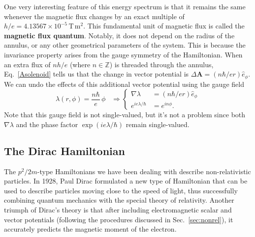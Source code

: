 \documentclass[pra,12pt]{revtex4}
\begin{document}
One very interesting feature of this energy spectrum is that it
remains the same whenever the magnetic flux changes by an exact
multiple of $h/e = 4.13567\times10^{-5}\,\mathrm{T}\,\mathrm{m}^2$.
This fundamental unit of magnetic flux is called the \textbf{magnetic
  flux quantum}.  Notably, it does not depend on the radius of the
annulus, or any other geometrical parameters of the system.  This is
because the invariance property arises from the gauge symmetry of the
Hamiltonian.  When an extra flux of $nh/e$ (where $n\in\mathbb{Z}$) is
threaded through the annulus, Eq.~\eqref{Asolenoid} tells us that the
change in vector potential is $\Delta \mathbf{A} = (n\hbar/ e r)
\hat{e}_\phi$.  We can undo the effects of this additional vector
potential using the gauge field
\begin{equation}
  \lambda(r,\phi) = \frac{n\hbar}{e} \, \phi \;\;\;\Rightarrow
  \begin{cases}\nabla \lambda &= \displaystyle (n\hbar/er) \hat{e}_\phi
    \\ \displaystyle e^{ie\lambda/\hbar} &= \displaystyle e^{in\phi}.
  \end{cases}
\end{equation}
Note that this gauge field is not single-valued, but it's not a
problem since both $\nabla\lambda$ and the phase factor
$\exp(ie\lambda/\hbar)$ remain single-valued.

\subsection{The Dirac Hamiltonian}
\label{sec:DiracH}

The $p^2/2m$-type Hamiltonians we have been dealing with describe
non-relativistic particles.  In 1928, Paul Dirac formulated a new type
of Hamiltonian that can be used to describe particles moving close to
the speed of light, thus successfully combining quantum mechanics with
the special theory of relativity. Another triumph of Dirac's theory is
that after including electromagnetic scalar and vector potentials
(following the procedures discussed in Sec.~\ref{sec:nonrel}), it
accurately predicts the magnetic moment of the electron.
\end{document}
